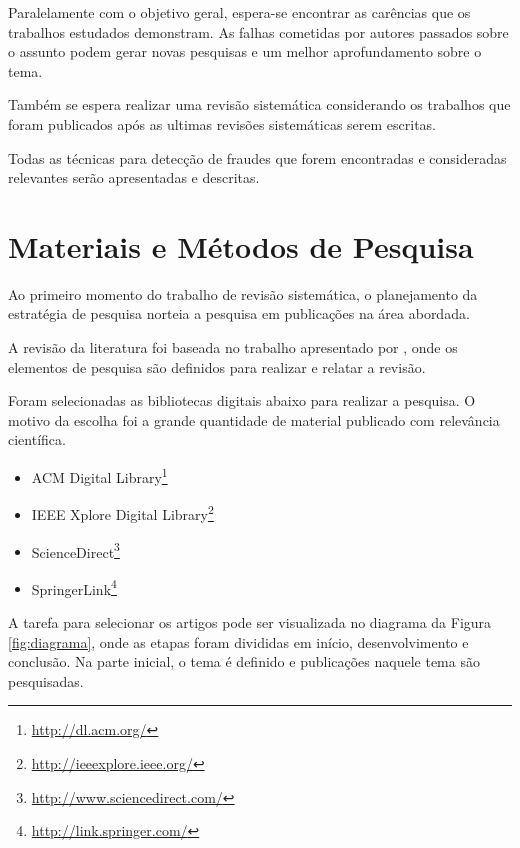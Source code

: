 \documentclass[smallextended]{svjour3}       %
\begin{document}
Paralelamente com o objetivo geral, espera-se encontrar as carências que os trabalhos estudados demonstram. As falhas cometidas por autores passados sobre o assunto podem gerar novas pesquisas e um melhor aprofundamento sobre o tema. 

Também se espera realizar uma revisão sistemática considerando os trabalhos que foram publicados após as ultimas revisões sistemáticas serem escritas.

Todas as técnicas para detecção de fraudes que forem encontradas e consideradas relevantes serão apresentadas e descritas.

\section{Materiais e Métodos de Pesquisa}
\label{sec:1}

Ao primeiro momento do trabalho de revisão sistemática, o planejamento da estratégia de pesquisa norteia a pesquisa em publicações na área abordada.

A revisão da literatura foi baseada no trabalho apresentado por \cite{Kitchenham07guidelinesfor}, onde os elementos de pesquisa são definidos para realizar e relatar a revisão.

Foram selecionadas as bibliotecas digitais abaixo para realizar a pesquisa. O motivo da escolha foi a grande quantidade de material publicado com relevância científica.

\begin{itemize}
	\item \textsf{ACM Digital Library}\footnote{\url{http://dl.acm.org/}}
	
	\item \textsf{IEEE Xplore Digital Library}\footnote{\url{http://ieeexplore.ieee.org/}}
	
	\item \textsf{ScienceDirect}\footnote{\url{http://www.sciencedirect.com/}} 	
	
	\item \textsf{SpringerLink}\footnote{\url{http://link.springer.com/}}
\end{itemize}

A tarefa para selecionar os artigos pode ser visualizada no diagrama da Figura \ref{fig:diagrama}, onde as etapas foram divididas em início, desenvolvimento e conclusão. Na parte inicial, o tema é definido e publicações naquele tema são pesquisadas. 
\end{document}
